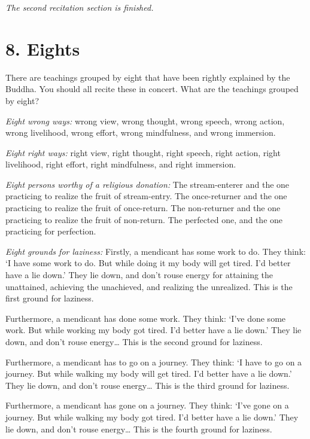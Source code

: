 \documentclass[12pt,openany]{book}%
\newcommand*{\scendsection}[1]{\begin{Center}\begin{small}\textit{#1}\end{small}\end{Center}\addvspace{1em}}
\begin{document}
\scendsection{The second recitation section is finished. }

\section*{8. Eights }

There are teachings grouped by eight that have been rightly explained by the Buddha. You should all recite these in concert. What are the teachings grouped by eight? 

\emph{Eight wrong ways:} wrong view, wrong thought, wrong speech, wrong action, wrong livelihood, wrong effort, wrong mindfulness, and wrong immersion. 

\emph{Eight right ways:} right view, right thought, right speech, right action, right livelihood, right effort, right mindfulness, and right immersion. 

\emph{Eight persons worthy of a religious donation:} The stream-enterer and the one practicing to realize the fruit of stream-entry. The once-returner and the one practicing to realize the fruit of once-return. The non-returner and the one practicing to realize the fruit of non-return. The perfected one, and the one practicing for perfection. 

\emph{Eight grounds for laziness:} Firstly, a mendicant has some work to do. They think: ‘I have some work to do. But while doing it my body will get tired. I’d better have a lie down.’ They lie down, and don’t rouse energy for attaining the unattained, achieving the unachieved, and realizing the unrealized. This is the first ground for laziness. 

Furthermore, a mendicant has done some work. They think: ‘I’ve done some work. But while working my body got tired. I’d better have a lie down.’ They lie down, and don’t rouse energy… This is the second ground for laziness. 

Furthermore, a mendicant has to go on a journey. They think: ‘I have to go on a journey. But while walking my body will get tired. I’d better have a lie down.’ They lie down, and don’t rouse energy… This is the third ground for laziness. 

Furthermore, a mendicant has gone on a journey. They think: ‘I’ve gone on a journey. But while walking my body got tired. I’d better have a lie down.’ They lie down, and don’t rouse energy… This is the fourth ground for laziness. 
\end{document}
